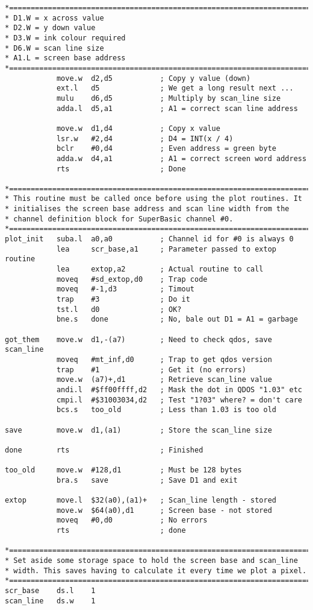 \begin{lstlisting}[firstnumber=1,caption={Mode 4 Screen Plotting},label={lst:Mode4ScreenPlotting}]
*======================================================================
* D1.W = x across value
* D2.W = y down value
* D3.W = ink colour required
* D6.W = scan line size
* A1.L = screen base address
*======================================================================
            move.w  d2,d5           ; Copy y value (down)
            ext.l   d5              ; We get a long result next ...
            mulu    d6,d5           ; Multiply by scan_line size
            adda.l  d5,a1           ; A1 = correct scan line address

            move.w  d1,d4           ; Copy x value
            lsr.w   #2,d4           ; D4 = INT(x / 4)
            bclr    #0,d4           ; Even address = green byte
            adda.w  d4,a1           ; A1 = correct screen word address
            rts                     ; Done

*======================================================================
* This routine must be called once before using the plot routines. It
* initialises the screen base address and scan line width from the 
* channel definition block for SuperBasic channel #0.
*======================================================================
plot_init   suba.l  a0,a0           ; Channel id for #0 is always 0
            lea     scr_base,a1     ; Parameter passed to extop routine
            lea     extop,a2        ; Actual routine to call
            moveq   #sd_extop,d0    ; Trap code
            moveq   #-1,d3          ; Timout
            trap    #3              ; Do it
            tst.l   d0              ; OK?
            bne.s   done            ; No, bale out D1 = A1 = garbage

got_them    move.w  d1,-(a7)        ; Need to check qdos, save scan_line
            moveq   #mt_inf,d0      ; Trap to get qdos version
            trap    #1              ; Get it (no errors)
            move.w  (a7)+,d1        ; Retrieve scan_line value
            andi.l  #$ff00ffff,d2   ; Mask the dot in QDOS "1.03" etc
            cmpi.l  #$31003034,d2   ; Test "1?03" where? = don't care
            bcs.s   too_old         ; Less than 1.03 is too old

save        move.w  d1,(a1)         ; Store the scan_line size

done        rts                     ; Finished

too_old     move.w  #128,d1         ; Must be 128 bytes
            bra.s   save            ; Save D1 and exit

extop       move.l  $32(a0),(a1)+   ; Scan_line length - stored
            move.w  $64(a0),d1      ; Screen base - not stored
            moveq   #0,d0           ; No errors
            rts                     ; done

*======================================================================
* Set aside some storage space to hold the screen base and scan_line 
* width. This saves having to calculate it every time we plot a pixel.
*======================================================================
scr_base    ds.l    1
scan_line   ds.w    1
\end{lstlisting}

